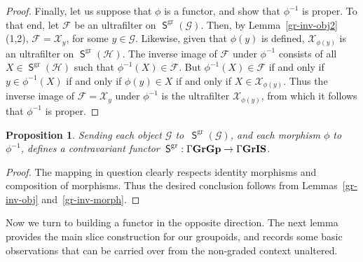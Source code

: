 \documentclass[a4paper,reqno,12pt]{amsart}
\numberwithin{equation}{section}
\theoremstyle{plain}
\newtheorem{prop}[thm]{Proposition}
\theoremstyle{definition}
\newcommand{\gr}{\operatorname{gr}}
\newcommand{\GIS}{\operatorname{\Gamma\bf{GrIS}}}
\newcommand{\GG}{\operatorname{\Gamma\bf{GrGp}}}
\newcommand{\SG}{\operatorname{\mathsf{S}}}
\begin{document}
\begin{proof}
Finally, let us suppose that $\phi$ is a functor, and show that $\phi^{-1}$ is proper. To that end, let $\mathcal{F}$ be an ultrafilter on $\SG^{\gr}(\mathscr{G})$. Then, by Lemma~\ref{gr-inv-obj2}(1,2), $\mathcal{F} = \mathcal{X}_y$, for some $y \in \mathscr{G}$. Likewise, given that $\phi(y)$ is defined, $\mathcal{X}_{\phi(y)}$ is an ultrafilter on $\SG^{\gr}(\mathscr{H})$. The inverse image of $\mathcal{F}$ under $\phi^{-1}$ consists of all $X \in \SG^{\gr}(\mathscr{H})$ such that $\phi^{-1}(X) \in \mathcal{F}$. But $\phi^{-1}(X) \in \mathcal{F}$ if and only if $y \in \phi^{-1}(X)$ if and only if $\phi(y) \in X$ if and only if $X \in \mathcal{X}_{\phi(y)}$. Thus the inverse image of $\mathcal{F} = \mathcal{X}_y$ under $\phi^{-1}$ is the ultrafilter $\mathcal{X}_{\phi(y)}$, from which it follows that $\phi^{-1}$ is proper.
\end{proof}

\begin{prop} \label{gp-to-sg-fuct}
Sending each object $\mathscr{G}$ to $\, \SG^{\gr}(\mathscr{G})$, and each morphism $\phi$ to $\phi^{-1}$, defines a contravariant functor $\, \SG^{\gr} : \GG \to \GIS$.
\end{prop}

\begin{proof}
The mapping in question clearly respects identity morphisms and composition of morphisms. Thus the desired conclusion follows from Lemmas~\ref{gr-inv-obj} and~\ref{gr-inv-morph}.
\end{proof}

Now we turn to building a functor in the opposite direction. The next lemma provides the main slice construction for our groupoids, and records some basic observations that can be carried over from the non-graded context unaltered. 
\end{document}
